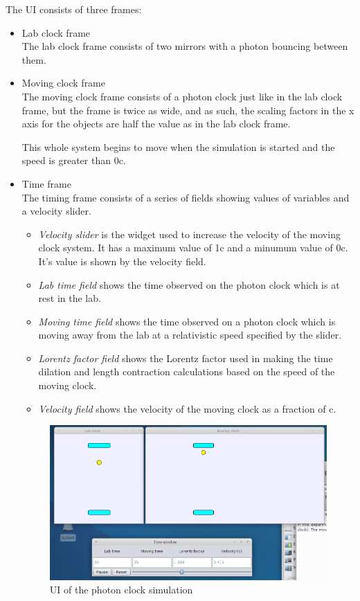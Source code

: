 \documentclass[11pt]{article}
\begin{document}
The UI consists of three frames:
\begin{itemize}

\item Lab clock frame\\
\label{sec-3-3-3-1}%
The lab clock frame consists of two mirrors with a photon bouncing between them.

\item Moving clock frame\\
\label{sec-3-3-3-2}%
The moving clock frame consists of a photon clock just like in the lab clock frame, but the frame is twice as wide, and as such, the scaling factors in the x axis for the objects are half the value as in the lab clock frame.

This whole system begins to move when the simulation is started and the speed is greater than 0c.

\item Time frame\\
\label{sec-3-3-3-3}%
The timing frame consists of a series of fields showing values of variables and a velocity slider.

\begin{itemize}
\item \emph{Velocity slider} is the widget used to increase the velocity of the moving clock system. It has a maximum value of 1c and a minumum value of 0c. It's value is shown by the velocity field.
\item \emph{Lab time field} shows the time observed on the photon clock which is at rest in the lab.
\item \emph{Moving time field} shows the time observed on a photon clock which is moving away from the lab at a relativistic speed specified by the slider.
\item \emph{Lorentz factor field} shows the Lorentz factor used in making the time dilation and length contraction calculations based on the speed of the moving clock.
\item \emph{Velocity field} shows the velocity of the moving clock as a fraction of c.
\end{itemize}

\begin{figure}[htb]
\centering
\includegraphics[width=.9\linewidth]{./mirrorUI.png}
\caption{UI of the photon clock simulation}
\end{figure}
\end{itemize} %
\end{document}
